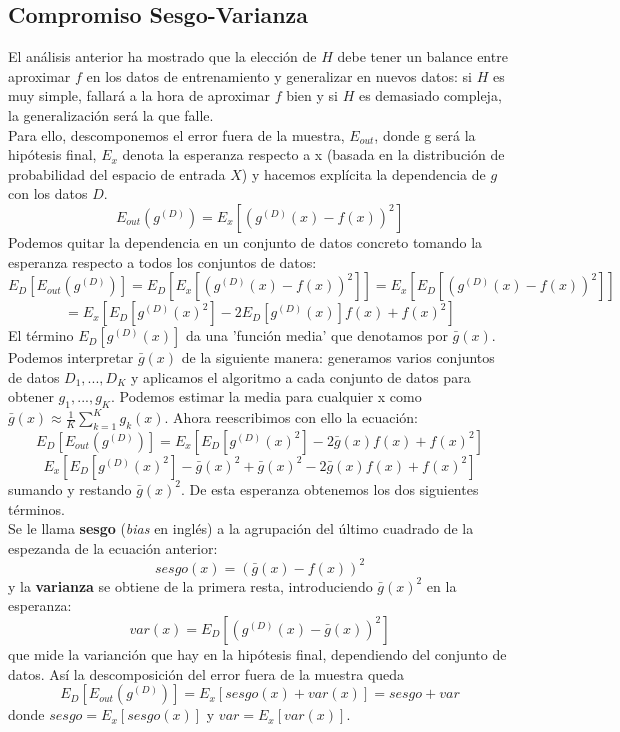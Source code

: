 \subsection{Compromiso Sesgo-Varianza}
El análisis anterior ha mostrado que la elección de $H$ debe tener un balance entre aproximar $f$ en los datos de entrenamiento y generalizar en nuevos datos: si $H$ es muy simple, fallará a la hora de aproximar $f$ bien y si $H$ es demasiado compleja, la generalización será la que falle.\\
Para ello, descomponemos el error fuera de la muestra, $E_{out}$, donde g será la hipótesis final, $E_{x}$ denota la esperanza respecto a x (basada en la distribución de probabilidad del espacio de entrada $X$) y hacemos explícita la dependencia de $g$ con los datos $D$.
\[ E_{out}(g^{(D)})=E_{x} \left[ (g^{(D)}(x)-f(x))^{2} \right]  \]
Podemos quitar la dependencia en un conjunto de datos concreto tomando la esperanza respecto a todos los conjuntos de datos:
\[ E_{D}[E_{out}(g^{(D)})]=E_{D} \left[ E_{x} [ (g^{(D)}(x)-f(x))^{2} ] \right] = E_{x} \left[ E_{D}[(g^{(D)}(x)-f(x))^{2}] \right] \]
\[ =E_{x} \left[ E_{D}[g^{(D)}(x)^{2}] - 2E_{D}[g^{(D)}(x)]f(x)+f(x)^{2} \right] \]
El término $E_{D}[g^{(D)}(x)]$ da una 'función media' que denotamos por $\bar{g}(x)$. Podemos interpretar $\bar{g}(x)$ de la siguiente manera: generamos varios conjuntos de datos $D_{1},...,D_{K}$ y aplicamos el algoritmo a cada conjunto de datos para obtener $g_{1},...,g_{K}$. Podemos estimar la media para cualquier x como $\bar{g}(x) \approx \frac{1}{K} \sum_{k=1}^{K} g_{k}(x)$. Ahora reescribimos con ello la ecuación:
\[ E_{D}[E_{out}(g^{(D)})] = E_{x} \left[ E_{D}[g^{(D)}(x)^{2}] - 2\bar{g}(x)f(x)+f(x)^{2} \right] \]
\[ E_{x} \left[ E_{D}[g^{(D)}(x)^{2}] - \bar{g}(x)^{2} + \bar{g}(x)^{2} - 2\bar{g}(x)f(x)+f(x)^{2} \right] \]
sumando y restando $\bar{g}(x)^{2}$. De esta esperanza obtenemos los dos siguientes términos.\\
Se le llama \textbf{sesgo} (\textit{bias} en inglés) a la agrupación del último cuadrado de la espezanda de la ecuación anterior:
\[ sesgo(x)=(\bar{g}(x)-f(x))^{2} \]
y la \textbf{varianza} se obtiene de la primera resta, introduciendo $\bar{g}(x)^{2}$ en la esperanza:
\[ var(x)=E_{D}[(g^{(D)}(x)-\bar{g}(x))^{2}] \]
que mide la varianción que hay en la hipótesis final, dependiendo del conjunto de datos. Así la descomposición del error fuera de la muestra queda
\[ E_{D}[E_{out}(g^{(D)})]=E_{x}[sesgo(x)+var(x)] = sesgo+var \]
donde $sesgo=E_{x}[sesgo(x)]$ y $var=E_{x}[var(x)]$.\cite{abu2012learning} \\
